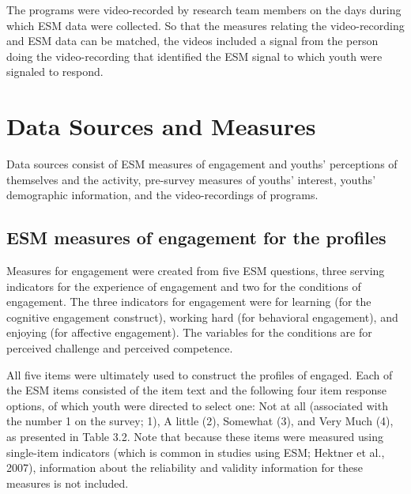 \documentclass[]{msu-thesis}
\theoremstyle{definition}
\theoremstyle{definition}
\theoremstyle{definition}
\theoremstyle{remark}
\begin{document}
The programs were video-recorded by research team members on the days
during which ESM data were collected. So that the measures relating the
video-recording and ESM data can be matched, the videos included a
signal from the person doing the video-recording that identified the ESM
signal to which youth were signaled to respond.

\section{Data Sources and Measures}\label{data-sources-and-measures}

Data sources consist of ESM measures of engagement and youths'
perceptions of themselves and the activity, pre-survey measures of
youths' interest, youths' demographic information, and the
video-recordings of programs.

\subsection{ESM measures of engagement for the
profiles}\label{esm-measures-of-engagement-for-the-profiles}

Measures for engagement were created from five ESM questions, three
serving indicators for the experience of engagement and two for the
conditions of engagement. The three indicators for engagement were for
learning (for the cognitive engagement construct), working hard (for
behavioral engagement), and enjoying (for affective engagement). The
variables for the conditions are for perceived challenge and perceived
competence.

All five items were ultimately used to construct the profiles of
engaged. Each of the ESM items consisted of the item text and the
following four item response options, of which youth were directed to
select one: Not at all (associated with the number 1 on the survey; 1),
A little (2), Somewhat (3), and Very Much (4), as presented in Table
3.2. Note that because these items were measured using single-item
indicators (which is common in studies using ESM; Hektner et al., 2007),
information about the reliability and validity information for these
measures is not included.
\end{document}
